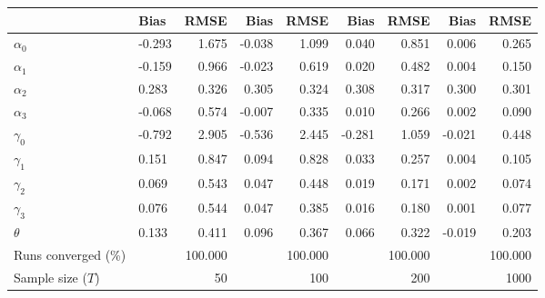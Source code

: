 
\begin{tabular}[t]{llrrrrrrr}
\toprule
  & Bias & RMSE & Bias & RMSE & Bias & RMSE & Bias & RMSE\\
\midrule
$\alpha_{0}$ & -0.293 & 1.675 & -0.038 & 1.099 & 0.040 & 0.851 & 0.006 & 0.265\\
$\alpha_{1}$ & -0.159 & 0.966 & -0.023 & 0.619 & 0.020 & 0.482 & 0.004 & 0.150\\
$\alpha_{2}$ & 0.283 & 0.326 & 0.305 & 0.324 & 0.308 & 0.317 & 0.300 & 0.301\\
$\alpha_{3}$ & -0.068 & 0.574 & -0.007 & 0.335 & 0.010 & 0.266 & 0.002 & 0.090\\
$\gamma_{0}$ & -0.792 & 2.905 & -0.536 & 2.445 & -0.281 & 1.059 & -0.021 & 0.448\\
$\gamma_{1}$ & 0.151 & 0.847 & 0.094 & 0.828 & 0.033 & 0.257 & 0.004 & 0.105\\
$\gamma_{2}$ & 0.069 & 0.543 & 0.047 & 0.448 & 0.019 & 0.171 & 0.002 & 0.074\\
$\gamma_{3}$ & 0.076 & 0.544 & 0.047 & 0.385 & 0.016 & 0.180 & 0.001 & 0.077\\
$\theta$ & 0.133 & 0.411 & 0.096 & 0.367 & 0.066 & 0.322 & -0.019 & 0.203\\
Runs converged (\%) &  & 100.000 &  & 100.000 &  & 100.000 &  & 100.000\\
Sample size ($T$) &  & 50 &  & 100 &  & 200 &  & 1000\\
\bottomrule
\end{tabular}
